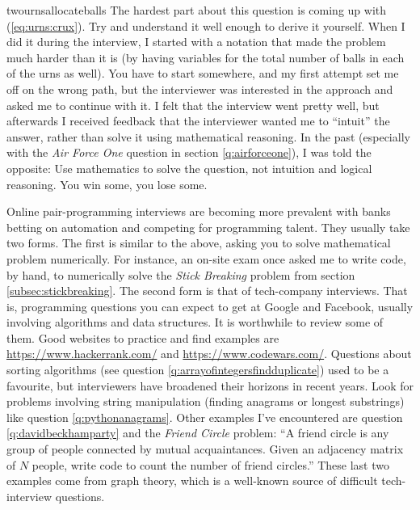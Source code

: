 \begin{answer}{twournsallocateballs}
The hardest part about this question is coming up with (\ref{eq:urns:crux}).
Try and understand it well enough to derive it yourself.
When I did it during the interview, I started with a notation that made the problem much harder than it is (by having variables for the total number of balls in each of the urns as well).
You have to start somewhere, and my first attempt set me off on the wrong path,
but the interviewer was interested in the approach and asked me to continue with it.
I felt that the interview went pretty well, but afterwards I received feedback that the interviewer wanted me to ``intuit'' the answer, rather than solve it using mathematical reasoning.
In the past (especially with the \emph{Air Force One} question in section \ref{q:airforceone}), I was told the opposite: Use mathematics to solve the question, not intuition and logical reasoning.
You win some, you lose some.

Online pair-programming interviews are becoming more prevalent with banks betting on automation and competing for programming talent.
They usually take two forms.
The first is similar to the above, asking you to solve mathematical problem numerically.
For instance, an on-site exam once asked me to write code, by hand, to numerically solve the \emph{Stick Breaking} problem from section \ref{subsec:stickbreaking}.
The second form is that of tech-company interviews.
That is, programming questions you can expect to get at Google and Facebook, usually involving algorithms and data structures.
It is worthwhile to review some of them.
Good websites to practice and find examples are
\url{https://www.hackerrank.com/} and
\url{https://www.codewars.com/}.
Questions about sorting algorithms (see question \ref{q:arrayofintegersfindduplicate}) used to be a favourite, but interviewers have broadened their horizons in recent years.
Look for problems involving string manipulation (finding anagrams or longest substrings) like question \ref{q:pythonanagrams}.
Other examples I've encountered are question
\ref{q:davidbeckhamparty} and the \emph{Friend Circle} problem:
``A friend circle is any group of people connected by mutual acquaintances. Given an adjacency matrix of $N$ people, write code to count the number of friend circles.''
These last two examples come from graph theory, which is a well-known source of difficult tech-interview questions.


\end{answer}
